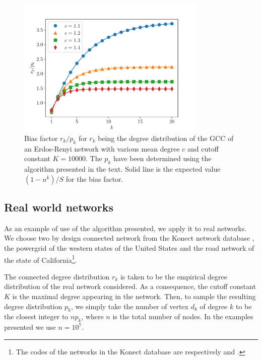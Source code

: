 \documentclass[
11pt, %
english, %
singlespacing, %
nolistspacing, %
liststotoc, %
headsepline, %
]{MastersDoctoralThesis} %
\begin{document}
\begin{figure}
	\includegraphics[width=0.8\textwidth]{ER_reconstruction.pdf}
	\caption{Bias factor $r_k/p_k$ for $r_k$ being the degree distribution of the GCC of an Erdos-Renyi network with various mean degree $c$ and cutoff constant $K = 10000$. The $p_k$ have been determined using the algorithm presented in the text. Solid line is the expected value $(1 - u^k)/S$ for the bias factor.}
	\label{Figure: Erdos-Renyi reconstruction}
\end{figure}

\subsection{Real world networks}

As an example of use of the algorithm presented, we apply it to real networks. We choose two by design connected network from the Konect network database \cite{kunegis2013konect}, the powergrid of the western states of the United States and the road network of the state of California\footnote{The codes of the networks in the Konect database are respectively  and .}.

The connected degree distribution $r_k$ is taken to be the empirical degree distribution of the real network considered. As a consequence, the cutoff constant $K$ is the maximal degree appearing in the network. Then, to sample the resulting degree distribution $p_k$, we simply take the number of vertex $d_k$ of degree $k$ to be the closest integer to $n p_k$, where $n$ is the total number of nodes. In the examples presented we use $n = 10^7$.
\end{document}
